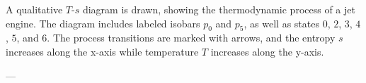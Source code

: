 A qualitative \( T \)-\( s \) diagram is drawn, showing the thermodynamic process of a jet engine. The diagram includes labeled isobars \( p_0 \) and \( p_5 \), as well as states \( 0 \), \( 2 \), \( 3 \), \( 4 \), \( 5 \), and \( 6 \). The process transitions are marked with arrows, and the entropy \( s \) increases along the x-axis while temperature \( T \) increases along the y-axis.  

---